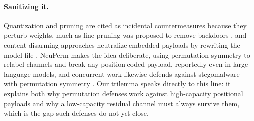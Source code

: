 \documentclass[a4paper,fleqn]{cas-dc}
\theoremstyle{plain}
\theoremstyle{remark}
\begin{document}
\paragraph{Sanitizing it.} Quantization and pruning are cited as incidental
countermeasures because they perturb weights, much as fine-pruning was proposed to
remove backdoors \cite{liu2018finepruning}, and content-disarming approaches neutralize
embedded payloads by rewriting the model file \cite{dubin2023disarming}. NeuPerm
\cite{gilkarov2025neuperm} makes the idea deliberate, using permutation symmetry to relabel
channels and break any position-coded payload, reportedly even in large language models, and
concurrent work likewise defends against stegomalware with permutation symmetry
\cite{torpmannhagen2025permutation}. Our trilemma speaks directly to this line: it explains
both why permutation defenses work against high-capacity positional payloads and why a
low-capacity residual channel must always survive them, which is the gap such defenses do not
yet close.
\end{document}
